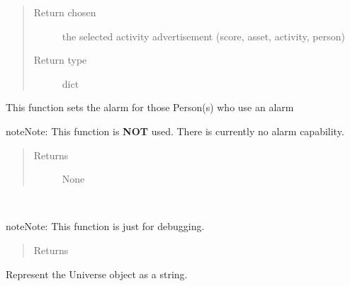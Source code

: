 \documentclass[letterpaper,10pt,english]{sphinxmanual}
\begin{document}
\begin{fulllineitems}
\begin{fulllineitems}
\begin{quote}
\begin{description}
\item[{Return chosen}] \leavevmode
the selected activity advertisement (score, asset, activity, person)

\item[{Return type}] \leavevmode
dict

\end{description}\end{quote}

\end{fulllineitems}


\begin{fulllineitems}
\label{universe:universe.Universe.set_alarm}
This function sets the alarm for those Person(s) who use an alarm

\begin{notice}{note}{Note:}
This function is \textbf{NOT} used. There is currently no alarm capability.
\end{notice}
\begin{quote}\begin{description}
\item[{Returns}] \leavevmode
None

\end{description}\end{quote}

\end{fulllineitems}


\begin{fulllineitems}
\label{universe:universe.Universe.test_func}~
\begin{notice}{note}{Note:}
This function is just for debugging.
\end{notice}
\begin{quote}\begin{description}
\item[{Returns}] \leavevmode


\end{description}\end{quote}

\end{fulllineitems}


\begin{fulllineitems}
\label{universe:universe.Universe.toString}
Represent the Universe object as a string.


\end{fulllineitems}
\end{fulllineitems}
\end{document}
